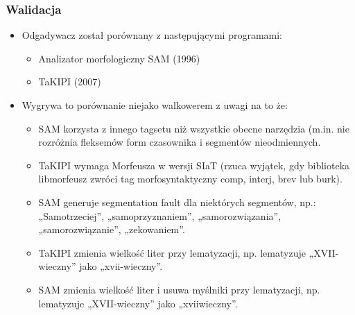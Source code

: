 \documentclass{beamer}
\begin{document}
\begin{frame}
\frametitle{Walidacja}
\begin{itemize}
\item Odgadywacz został porównany z następującymi programami:
\begin{itemize}
\item Analizator morfologiczny SAM (1996)
\item TaKIPI (2007)
\end{itemize}
\item Wygrywa to porównanie niejako walkowerem z uwagi na to że:
\begin{itemize}
\item SAM korzysta z innego tagsetu niż wszystkie obecne narzędzia (m.in. nie rozróżnia fleksemów form czasownika i segmentów nieodmiennych.
\item TaKIPI wymaga Morfeusza w wersji SIaT (rzuca wyjątek, gdy biblioteka libmorfeusz zwróci tag morfosyntaktyczny comp, interj, brev lub burk).
\item SAM generuje segmentation fault dla niektórych segmentów, np.: „Samotrzeciej”, „samoprzyznaniem”, „samorozwiązania”, „samorozwiązanie”, „zekowaniem”.
\item TaKIPI zmienia wielkość liter przy lematyzacji, np. lematyzuje „XVII-wieczny” jako „xvii-wieczny”.
\item SAM zmienia wielkość liter i usuwa myślniki przy lematyzacji, np. lematyzuje „XVII-wieczny” jako „xviiwieczny”.

\end{itemize}
\end{itemize}
\end{frame}
\end{document}
